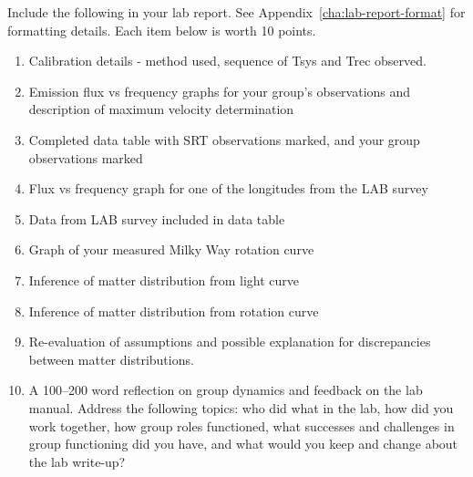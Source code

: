 Include the following in your lab report. See Appendix~\ref{cha:lab-report-format} for formatting details. Each item below is worth 10 points.

\begin{enumerate}
	\item Calibration details - method used, sequence of Tsys and Trec observed.
	\item Emission flux vs frequency graphs for your group's observations and description of maximum velocity determination
	\item Completed data table with SRT observations marked, and your group observations marked
	\item Flux vs frequency graph for one of the longitudes from the LAB survey
	\item Data from LAB survey included in data table
	\item Graph of your measured Milky Way rotation curve
	\item Inference of matter distribution from light curve
	\item Inference of matter distribution from rotation curve
	\item Re-evaluation of assumptions and possible explanation for discrepancies between matter distributions.
	\item A 100--200 word reflection on group dynamics and feedback on the lab manual. Address the following topics: who did what in the lab, how did you work together, how group roles functioned, what successes and challenges in group functioning did you have, and what would you keep and change about the lab write-up?
\end{enumerate}












